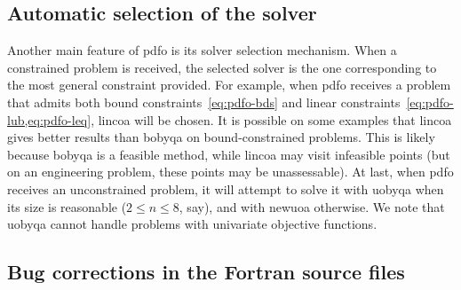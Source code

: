 \subsection{Automatic selection of the solver}
\label{subsec:solver-selection}

Another main feature of \gls{pdfo} is its solver selection mechanism.
When a constrained problem is received, the selected solver is the one corresponding to the most general constraint provided.
For example, when \gls{pdfo} receives a problem that admits both bound constraints~\cref{eq:pdfo-bds} and linear constraints~\cref{eq:pdfo-lub,eq:pdfo-leq}, \gls{lincoa} will be chosen.
It is possible on some examples that \gls{lincoa} gives better results than \gls{bobyqa} on bound-constrained problems.
This is likely because \gls{bobyqa} is a feasible method, while \gls{lincoa} may visit infeasible points (but on an engineering problem, these points may be unassessable).
At last, when \gls{pdfo} receives an unconstrained problem, it will attempt to solve it with \gls{uobyqa} when its size is reasonable ($2 \le n \le 8$, say), and with \gls{newuoa} otherwise.
We note that \gls{uobyqa} cannot handle problems with univariate objective functions.

\subsection{Bug corrections in the Fortran source files}
\label{subsec:bug-corrections}

